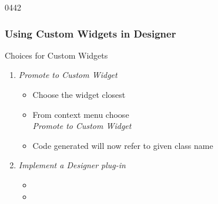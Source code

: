\begin{slide}[fragile]{0442}\frametitle{Using Custom Widgets in Designer}\label{designer_plugins}
Choices for Custom Widgets
\begin{enumerate}
\item \emph{Promote to Custom Widget}
  \begin{itemize}
  \item Choose the widget closest
  \item From context menu choose \\ \emph{Promote to Custom Widget}
  \item Code generated will now refer to given class name
  \end{itemize}
\item \emph{Implement a Designer plug-in}
  \begin{itemize}
  \item {}
  \item {}
  \end{itemize}
\end{enumerate}
\end{slide}

